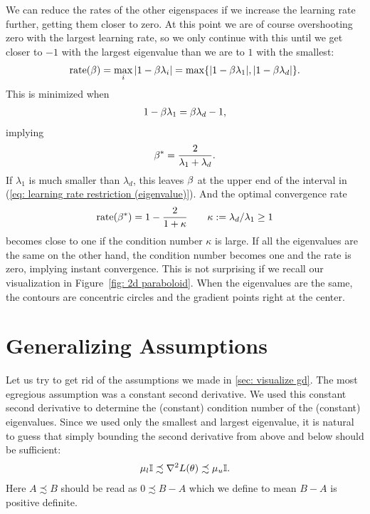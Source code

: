 We can reduce the rates of the other eigenspaces if we
increase the learning rate further, getting them closer to zero. At this point
we are of course overshooting zero with the largest learning rate, so we only
continue with this until we get closer to \(-1\) with the largest eigenvalue
than we are to \(1\) with the smallest:
%
\begin{align*}
	\text{rate}(\beta)=\max_{i} |1-\beta\lambda_i| = \max\{|1-\beta\lambda_1|, |1-\beta\lambda_d|\}.
\end{align*}
%
This is minimized when
%
\begin{align*}
	1-\beta\lambda_1 = \beta\lambda_d -1,
\end{align*}
%
implying
%
\begin{align*}
	\beta^* = \frac{2}{\lambda_1 + \lambda_d}.
\end{align*}
%
If \(\lambda_1\) is much smaller than \(\lambda_d\), this leaves \(\beta\)
at the upper end of the interval in (\ref{eq: learning rate restriction
(eigenvalue)}). And the optimal convergence rate
%
\begin{align*}
	\text{rate}(\beta^*)
	= 1 - \frac{2}{1+\kappa}
	\qquad \kappa:=\lambda_d/\lambda_1 \ge 1
\end{align*}
%
becomes close to one if the condition number \(\kappa\) is large.
If all the eigenvalues are the same on the other hand, the condition number
becomes one and the rate is zero, implying instant convergence. This is not
surprising if we recall our visualization in Figure~\ref{fig: 2d paraboloid}.
When the eigenvalues are the same, the contours are concentric circles and the
gradient points right at the center.


\section{Generalizing Assumptions}

Let us try to get rid of the assumptions we made in \ref{sec: visualize gd}.
The most egregious assumption was a constant second derivative. We used this
constant second derivative to determine the (constant) condition number of
the (constant) eigenvalues. Since we used only the smallest and largest
eigenvalue, it is natural to guess that simply bounding the second derivative
from above and below should be sufficient:
%
\begin{align*}
	\mu_l \mathbb{I} \precsim \nabla^2 L(\theta) \precsim \mu_u \mathbb{I}.
\end{align*}
%
Here \(A \precsim B\) should be read as \(0\precsim B-A\) which we define to mean
\(B-A\) is positive definite.


